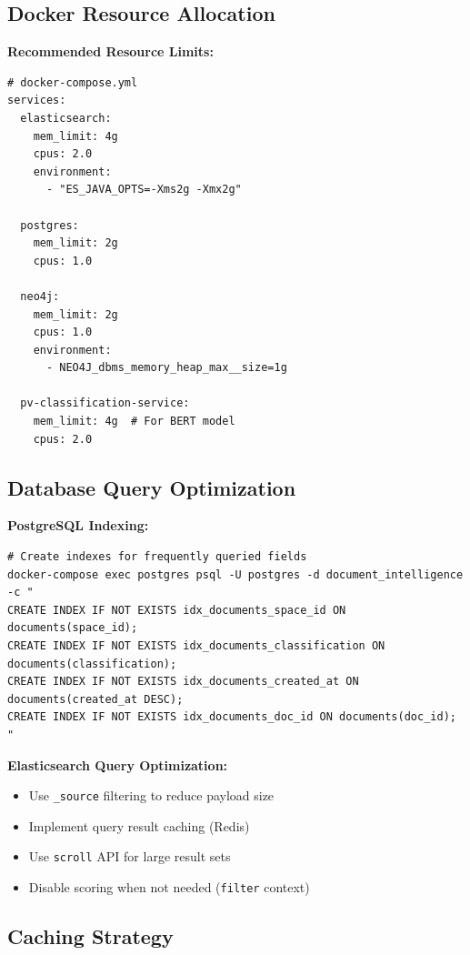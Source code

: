 \subsection{Docker Resource Allocation}

\textbf{Recommended Resource Limits:}

\begin{lstlisting}[style=pythonstyle]
# docker-compose.yml
services:
  elasticsearch:
    mem_limit: 4g
    cpus: 2.0
    environment:
      - "ES_JAVA_OPTS=-Xms2g -Xmx2g"
  
  postgres:
    mem_limit: 2g
    cpus: 1.0
  
  neo4j:
    mem_limit: 2g
    cpus: 1.0
    environment:
      - NEO4J_dbms_memory_heap_max__size=1g
  
  pv-classification-service:
    mem_limit: 4g  # For BERT model
    cpus: 2.0
\end{lstlisting}

\subsection{Database Query Optimization}

\textbf{PostgreSQL Indexing:}
\begin{commandbox}
\begin{lstlisting}[style=bashstyle]
# Create indexes for frequently queried fields
docker-compose exec postgres psql -U postgres -d document_intelligence -c "
CREATE INDEX IF NOT EXISTS idx_documents_space_id ON documents(space_id);
CREATE INDEX IF NOT EXISTS idx_documents_classification ON documents(classification);
CREATE INDEX IF NOT EXISTS idx_documents_created_at ON documents(created_at DESC);
CREATE INDEX IF NOT EXISTS idx_documents_doc_id ON documents(doc_id);
"
\end{lstlisting}
\end{commandbox}

\textbf{Elasticsearch Query Optimization:}
\begin{itemize}
    \item Use \texttt{\_source} filtering to reduce payload size
    \item Implement query result caching (Redis)
    \item Use \texttt{scroll} API for large result sets
    \item Disable scoring when not needed (\texttt{filter} context)
\end{itemize}

\subsection{Caching Strategy}

